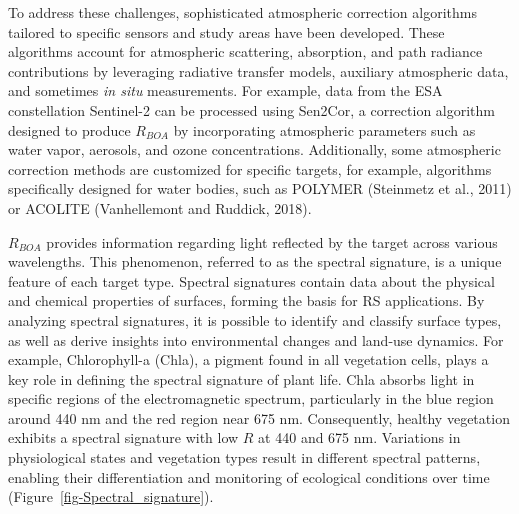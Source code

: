 \documentclass[
  letterpaper,
  11pt,
  english,
  singlespacing,
  headsepline]{MastersDoctoralThesis}
\begin{document}
\begin{spacing}{1.5}
To address these challenges, sophisticated atmospheric correction
algorithms tailored to specific sensors and study areas have been
developed. These algorithms account for atmospheric scattering,
absorption, and path radiance contributions by leveraging radiative
transfer models, auxiliary atmospheric data, and sometimes \emph{in
situ} measurements. For example, data from the ESA constellation
Sentinel-2 can be processed using Sen2Cor, a correction algorithm
designed to produce \(R_{BOA}\) by incorporating atmospheric parameters
such as water vapor, aerosols, and ozone concentrations. Additionally,
some atmospheric correction methods are customized for specific targets,
for example, algorithms specifically designed for water bodies, such as
POLYMER (Steinmetz et al., 2011) or ACOLITE (Vanhellemont and Ruddick,
2018).

\(R_{BOA}\) provides information regarding light reflected by the target
across various wavelengths. This phenomenon, referred to as the spectral
signature, is a unique feature of each target type. Spectral signatures
contain data about the physical and chemical properties of surfaces,
forming the basis for RS applications. By analyzing spectral signatures,
it is possible to identify and classify surface types, as well as derive
insights into environmental changes and land-use dynamics. For example,
Chlorophyll-a (Chla), a pigment found in all vegetation cells, plays a
key role in defining the spectral signature of plant life. Chla absorbs
light in specific regions of the electromagnetic spectrum, particularly
in the blue region around 440 nm and the red region near 675 nm.
Consequently, healthy vegetation exhibits a spectral signature with low
\(R\) at 440 and 675 nm. Variations in physiological states and
vegetation types result in different spectral patterns, enabling their
differentiation and monitoring of ecological conditions over time
(Figure~\ref{fig-Spectral_signature}).

\begin{figure}

\end{figure}
\end{spacing}
\end{document}
